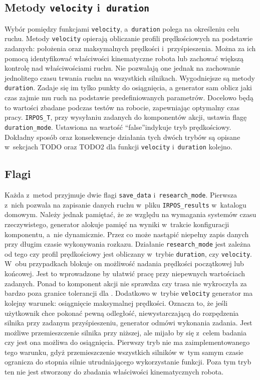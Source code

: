 \documentclass[a4paper, 12pt]{article}
\begin{document}
	\subsection{Metody \texttt{velocity} i~\texttt{duration}} 
	\label{sec:veldurdiff}
	Wybór pomiędzy funkcjami \texttt{velocity}, a~\texttt{duration} polega na określeniu celu ruchu. Metody \texttt{velocity} opierają obliczanie profili prędkościowych na podstawie zadanych: położenia oraz maksymalnych prędkości i~przyśpieszenia. Można za ich pomocą identyfikować właściwości kinematyczne robota lub zachować większą kontrolę nad właściwościami ruchu. Nie pozwalają one jednak na zachowanie jednolitego czasu trwania ruchu na wszystkich silnikach. Wygodniejsze są metody \texttt{duration}. Zadaje się im tylko punkty do osiągnięcia, a generator sam oblicz jaki czas zajmie mu ruch na podstawie predefiniowanych parametrów. Docelowo będą to wartości zbadane podczas testów na robocie, zapewniając optymalny czas pracy. \texttt{IRPOS\_T}, przy wysyłaniu zadanych do komponentów akcji, ustawia flagę \texttt{duration\_mode}. Ustawiona na wartość \textquotedblleft false\textquotedblright indykuje tryb prędkościowy. Dokładny sposób oraz konsekwencje działania tych dwóch trybów są opisane w~sekcjach TODO oraz TODO2 dla funkcji \texttt{velocity} i~\texttt{duration} kolejno. 
	
	\subsection{Flagi}
	\label{sec:flags}
	Każda z~metod przyjmuje dwie flagi \texttt{save\_data} i~\texttt{research\_mode}. Pierwsza z~nich pozwala na zapisanie danych ruchu w~pliku \texttt{IRPOS\_results} w~katalogu domowym. Należy jednak pamiętać, że ze względu na wymagania systemów czasu rzeczywistego, generator alokuje pamięć na wyniki w~trakcie konfiguracji komponentu, a~nie dynamicznie. Przez co może nastąpić niepełny zapis danych przy długim czasie wykonywania rozkazu. Działanie \texttt{research\_mode} jest zależna od tego czy profil prędkościowy jest obliczany w~trybie \texttt{duration}, czy \texttt{velocity}. W~obu przypadkach blokuje on możliwość nadania prędkości początkowej lub końcowej. Jest to wprowadzone by ułatwić pracę przy niepewnych wartościach zadanych. Ponad to komponent akcji nie sprawdza czy trasa nie wykroczyła za bardzo poza granice tolerancji dla . Dodatkowo w~trybie \texttt{velocity} generator ma kolejny warunek: osiągnięcie maksymalnej prędkości. Oznacza to, że jeśli użytkownik chce pokonać pewną odległość, niewystarczającą do rozpędzenia silnika przy zadanym przyśpieszeniu, generator odmówi wykonania zadania. Jest możliwe przemieszczenie silnika przy niższej, ale mijało by się z~celem badania czy jest ona możliwa do osiągnięcia. Pierwszy tryb nie ma zaimplementowanego tego warunku, gdyż przemieszczenie wszystkich silników w~tym samym czasie ogranicza do stopnia silnie utrudniającego wykorzystanie funkcji. Poza tym tryb ten nie jest stworzony do zbadania właściwości kinematycznych robota. 
	
\end{document}
